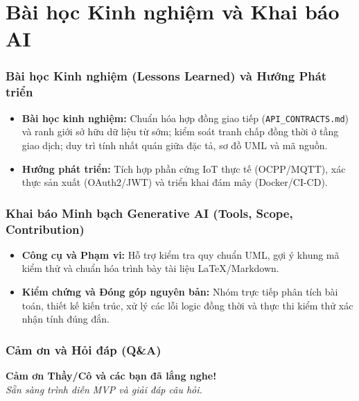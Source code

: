 \section{Bài học Kinh nghiệm và Khai báo AI}

\begin{frame}
\frametitle{Bài học Kinh nghiệm (Lessons Learned) và Hướng Phát triển}
\begin{itemize}
    \item \textbf{Bài học kinh nghiệm:} Chuẩn hóa hợp đồng giao tiếp (\texttt{API\_CONTRACTS.md}) và ranh giới sở hữu dữ liệu từ sớm; kiểm soát tranh chấp đồng thời ở tầng giao dịch; duy trì tính nhất quán giữa đặc tả, sơ đồ UML và mã nguồn.
    \item \textbf{Hướng phát triển:} Tích hợp phần cứng IoT thực tế (OCPP/MQTT), xác thực sản xuất (OAuth2/JWT) và triển khai đám mây (Docker/CI-CD).
\end{itemize}
\end{frame}

\begin{frame}
\frametitle{Khai báo Minh bạch Generative AI (Tools, Scope, Contribution)}
\begin{itemize}
    \item \textbf{Công cụ và Phạm vi:} Hỗ trợ kiểm tra quy chuẩn UML, gợi ý khung mã kiểm thử và chuẩn hóa trình bày tài liệu LaTeX/Markdown.
    \item \textbf{Kiểm chứng và Đóng góp nguyên bản:} Nhóm trực tiếp phân tích bài toán, thiết kế kiến trúc, xử lý các lỗi logic đồng thời và thực thi kiểm thử xác nhận tính đúng đắn.
\end{itemize}
\end{frame}

\begin{frame}
\frametitle{Cảm ơn và Hỏi đáp (Q\&A)}
\begin{center}
    {\Large \textbf{Cảm ơn Thầy/Cô và các bạn đã lắng nghe!}}\\[0.5cm]
    \textit{Sẵn sàng trình diễn MVP và giải đáp câu hỏi.}
\end{center}
\end{frame}

